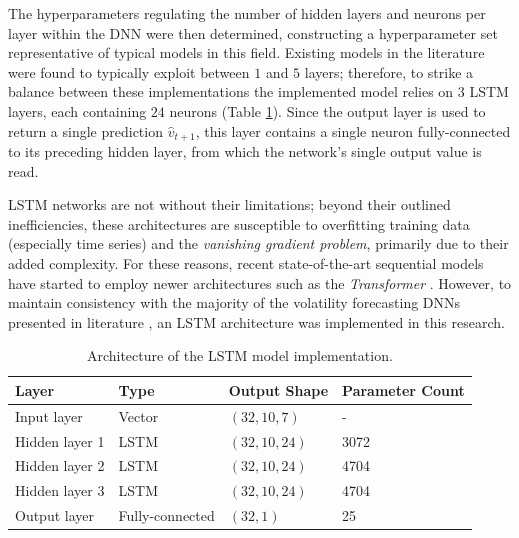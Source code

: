\documentclass[a4paper, 11pt]{report}
\begin{document}
    The hyperparameters regulating the number of hidden layers and neurons per layer within the DNN were then determined, constructing a hyperparameter set representative of typical models in this field. Existing models in the literature were found to typically exploit between $1$ \citep{bucci-2020} and $5$ \citep{kim-2018} layers; therefore, to strike a balance between these implementations the implemented model relies on $3$ LSTM layers, each containing $24$ neurons (Table \ref{table: architecture}). Since the output layer is used to return a single prediction $\hat{v}_{t+1}$, this layer contains a single neuron fully-connected to its preceding hidden layer, from which the network's single output value is read.

    LSTM networks are not without their limitations; beyond their outlined inefficiencies, these architectures are susceptible to overfitting training data (especially time series) and the \emph{vanishing gradient problem}, primarily due to their added complexity. For these reasons, recent state-of-the-art sequential models have started to employ newer architectures such as the \emph{Transformer} \citep{vaswani-2017}. However, to maintain consistency with the majority of the volatility forecasting DNNs presented in literature \citep{ge-2022}, an LSTM architecture was implemented in this research.


    \begin{table}[ht]
        \centering
        \begin{tabular}{|l|l|l|l|} 
        \hline
        \textbf{\footnotesize Layer} & \textbf{\footnotesize Type} & \textbf{\footnotesize Output Shape}   & \textbf{\footnotesize Parameter Count}  \\ 
        \hline
        Input layer    & Vector        & $(32, 10, 7)$  & -                         \\ 
        \hline
        Hidden layer 1 & LSTM          & $(32, 10, 24)$ & 3072                      \\ 
        \hline
        Hidden layer 2 & LSTM          & $(32, 10, 24)$ & 4704                      \\ 
        \hline
        Hidden layer 3 & LSTM          & $(32, 10, 24)$ & 4704                      \\ 
        \hline
        Output layer   & Fully-connected           & $(32, 1)$      & 25                        \\
        \hline
        \end{tabular}
        \caption{\centering Architecture of the LSTM model implementation.}
        \label{table: architecture}
    \end{table}
\end{document}
